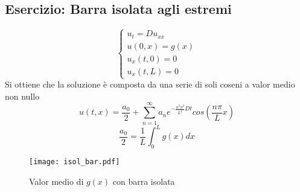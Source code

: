 \subsection{Esercizio: Barra isolata agli estremi}
\[
	\left\{
	\begin{array}{l}
		u_t=Du_{xx} \\
		u(0,x)=g(x) \\
		u_x(t,0)=0 \\
		u_x(t,L)=0
	\end{array}
	\right.
\]
Si ottiene che la soluzione \`e composta da una serie di soli coseni a 
valor medio non nullo
\[
	u(t,x)= \frac{a_0}{2}+ \sum_{n=1}^\infty a_n 
	e^{-\frac{n^2\pi^2}{L^2} Dt}
	cos \left(\frac{n\pi}{L}x \right)
\]
\[
	\frac{a_0}{2}= \frac{1}{L}\int_0^L g(x)dx
\]
\begin{figure}[H]
	\centering
	\texttt{[image: isol\_bar.pdf]}
	\caption{Valor medio di $g(x)$ con barra isolata}
	\label{isol_bar}
\end{figure}


